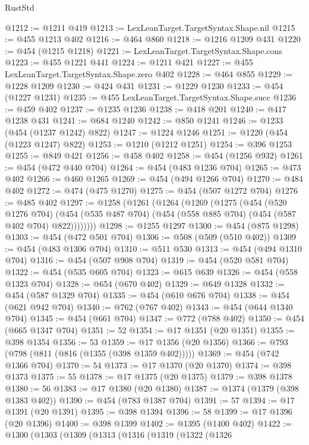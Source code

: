 \begin{lexlean}{RustStd}
\begin{coremodule}
@1212 := @1211 @419
@1213 := LexLeanTarget.TargetSyntax.Shape.nil
@1215 := @455 @1213 @402
@1216 := @464 @860
@1218 := @1216 @1209 @431
@1220 := @454 (@1215 @1218)
@1221 := LexLeanTarget.TargetSyntax.Shape.cons
@1223 := @455 @1221 @441
@1224 := @1211 @421
@1227 := @455 LexLeanTarget.TargetSyntax.Shape.zero @402
@1228 := @464 @855
@1229 := @1228 @1209
@1230 := @424 @431
@1231 := @1229 @1230
@1233 := @454 (@1227 @1231)
@1235 := @455 LexLeanTarget.TargetSyntax.Shape.succ
@1236 := @459 @402
@1237 := @1235 @1236
@1238 := @418 @201
@1240 := @417 @1238 @431
@1241 := @684 @1240
@1242 := @850 @1241
@1246 := @1233 (@454 (@1237 @1242) @822)
@1247 := @1224 @1246
@1251 := @1220 (@454 (@1223 @1247) @822)
@1253 := @1210 (@1212 @1251)
@1254 := @396 @1253
@1255 := @849 @421
@1256 := @458 @402
@1258 := @454 (@1256 @932)
@1261 := @454 (@472 @440 @704)
@1264 := @454 (@483 @1236 @704)
@1265 := @473 @402
@1266 := @460 @1265
@1269 := @454 (@494 @1266 @704)
@1270 := @484 @402
@1272 := @474 (@475 @1270)
@1275 := @454 (@507 @1272 @704)
@1276 := @485 @402
@1297 := @1258
    (@1261
      (@1264
        (@1269
          (@1275
            (@454
              (@520 @1276 @704)
              (@454 (@535 @487 @704) (@454 (@558 @885 @704) (@454 (@587 @402 @704) @822))))))))
@1298 := @1255 @1297
@1300 := @454 (@875 @1298)
@1303 := @454 (@472 @501 @704)
@1306 := @508 (@509 (@510 @402))
@1309 := @454 (@483 @1306 @704)
@1310 := @511 @530
@1313 := @454 (@494 @1310 @704)
@1316 := @454 (@507 @908 @704)
@1319 := @454 (@520 @581 @704)
@1322 := @454 (@535 @605 @704)
@1323 := @615 @639
@1326 := @454 (@558 @1323 @704)
@1328 := @654 (@670 @402)
@1329 := @649 @1328
@1332 := @454 (@587 @1329 @704)
@1335 := @454 (@610 @676 @704)
@1338 := @454 (@621 @942 @704)
@1340 := @762 (@767 @402)
@1343 := @454 (@644 @1340 @704)
@1345 := @454 (@661 @704)
@1347 := @772 (@788 @402)
@1350 := @454 (@665 @1347 @704)
@1351 := 52
@1354 := @17 @1351 (@20 @1351)
@1355 := @398 @1354
@1356 := 53
@1359 := @17 @1356 (@20 @1356)
@1366 := @793 (@798 (@811 (@816 (@1355 (@398 @1359 @402)))))
@1369 := @454 (@742 @1366 @704)
@1370 := 54
@1373 := @17 @1370 (@20 @1370)
@1374 := @398 @1373
@1375 := 55
@1378 := @17 @1375 (@20 @1375)
@1379 := @398 @1378
@1380 := 56
@1383 := @17 @1380 (@20 @1380)
@1387 := @1374 (@1379 (@398 @1383 @402))
@1390 := @454 (@783 @1387 @704)
@1391 := 57
@1394 := @17 @1391 (@20 @1391)
@1395 := @398 @1394
@1396 := 58
@1399 := @17 @1396 (@20 @1396)
@1400 := @398 @1399
@1402 := @1395 (@1400 @402)
@1422 := @1300
    (@1303
      (@1309
        (@1313
          (@1316
            (@1319
              (@1322
                (@1326

\end{coremodule}
\end{lexlean}
